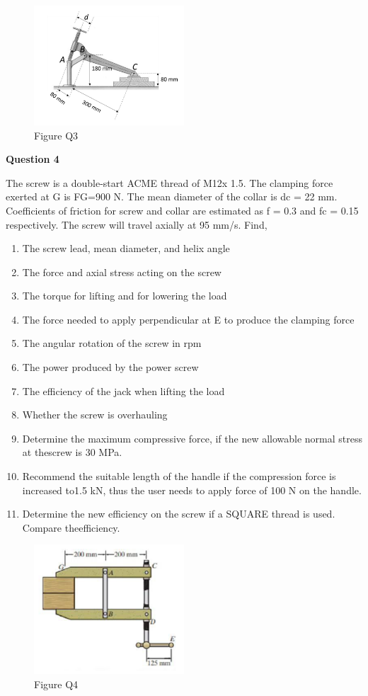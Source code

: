 \documentclass[a4paper, fleqn]{article}
\begin{document}
\begin{figure}[h]
    \centering
    \includegraphics[width=0.5\textwidth]{t2-q3.png}
    \caption{Figure Q3}
\end{figure}


\newpage
\textbf{Question 4}

The screw is a double-start ACME thread of M12x 1.5. The clamping force exerted at G is FG=900 N. The mean diameter of the collar is dc = 22 mm. Coefficients of friction for screw and collar are estimated as f = 0.3 and fc = 0.15 respectively. The screw will travel axially at 95 mm/s. Find,

\begin{enumerate}[label=(\roman*)]
\item The screw lead, mean diameter, and helix angle
\item The force and axial stress acting on the screw
\item The torque for lifting and for lowering the load
\item The force needed to apply perpendicular at E to produce the clamping force
\item The angular rotation of the screw in rpm
\item The power produced by the power screw
\item The efficiency of the jack when lifting the load
\item Whether the screw is overhauling
\item Determine the maximum compressive force, if the new allowable normal stress at thescrew is 30 MPa.
\item Recommend the suitable length of the handle if the compression force is increased to1.5 kN, thus the user needs to apply force of 100 N on the handle.
\item Determine the new efficiency on the screw if a SQUARE thread is used. Compare theefficiency.
\end{enumerate}

\begin{figure}[h]
    \centering
    \includegraphics[width=0.5\textwidth]{t2-q4.png}
    \caption{Figure Q4}
\end{figure}
\end{document}

